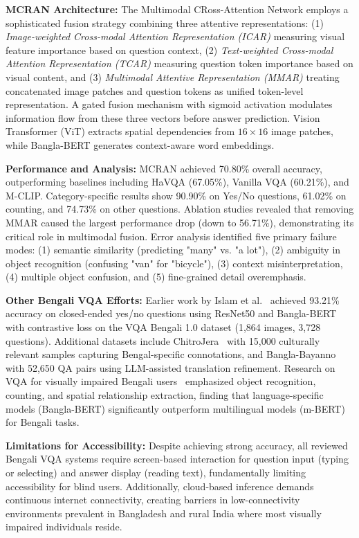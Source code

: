 \documentclass[conference]{IEEEtran}
\begin{document}
\textbf{MCRAN Architecture:} The Multimodal CRoss-Attention Network employs a sophisticated fusion strategy combining three attentive representations: (1) \textit{Image-weighted Cross-modal Attention Representation (ICAR)} measuring visual feature importance based on question context, (2) \textit{Text-weighted Cross-modal Attention Representation (TCAR)} measuring question token importance based on visual content, and (3) \textit{Multimodal Attentive Representation (MMAR)} treating concatenated image patches and question tokens as unified token-level representation. A gated fusion mechanism with sigmoid activation modulates information flow from these three vectors before answer prediction. Vision Transformer (ViT) extracts spatial dependencies from $16 \times 16$ image patches, while Bangla-BERT generates context-aware word embeddings.

\textbf{Performance and Analysis:} MCRAN achieved 70.80\% overall accuracy, outperforming baselines including HaVQA (67.05\%), Vanilla VQA (60.21\%), and M-CLIP. Category-specific results show 90.90\% on Yes/No questions, 61.02\% on counting, and 74.73\% on other questions. Ablation studies revealed that removing MMAR caused the largest performance drop (down to 56.71\%), demonstrating its critical role in multimodal fusion. Error analysis identified five primary failure modes: (1) semantic similarity (predicting "many" vs. "a lot"), (2) ambiguity in object recognition (confusing "van" for "bicycle"), (3) context misinterpretation, (4) multiple object confusion, and (5) fine-grained detail overemphasis.

\textbf{Other Bengali VQA Efforts:} Earlier work by Islam et al.~\cite{bengali_vqa_2024} achieved 93.21\% accuracy on closed-ended yes/no questions using ResNet50 and Bangla-BERT with contrastive loss on the VQA Bengali 1.0 dataset (1,864 images, 3,728 questions). Additional datasets include ChitroJera~\cite{chitrojera_2025} with 15,000 culturally relevant samples capturing Bengal-specific connotations, and Bangla-Bayanno~\cite{bangla_bayanno_2025} with 52,650 QA pairs using LLM-assisted translation refinement. Research on VQA for visually impaired Bengali users~\cite{bengali_vi_vqa} emphasized object recognition, counting, and spatial relationship extraction, finding that language-specific models (Bangla-BERT) significantly outperform multilingual models (m-BERT) for Bengali tasks.

\textbf{Limitations for Accessibility:} Despite achieving strong accuracy, all reviewed Bengali VQA systems require screen-based interaction for question input (typing or selecting) and answer display (reading text), fundamentally limiting accessibility for blind users. Additionally, cloud-based inference demands continuous internet connectivity, creating barriers in low-connectivity environments prevalent in Bangladesh and rural India where most visually impaired individuals reside.
\end{document}
